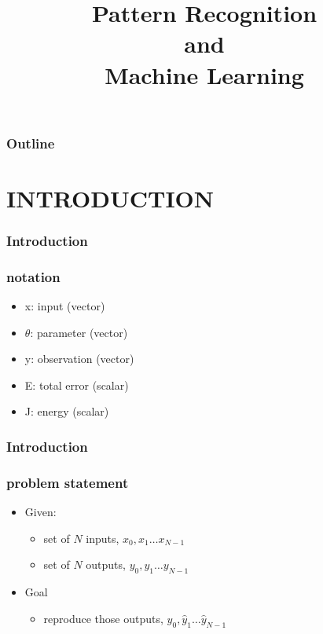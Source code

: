 
\title{Pattern Recognition \\ and \\ Machine Learning}
\begin{frame}\logoTree
	\institute{}
	\titlepage
\end{frame}

\begin{frame}\frametitle{Outline}\logoTree
	\setcounter{tocdepth}{1}	
	\tableofcontents
\end{frame}

\section{INTRODUCTION}
\begin{frame}
\frametitle{Introduction}
\frametitle{notation}
\logoCSIPCPL\mypagenum
	\begin{itemize}
		\item x: input (vector)
		\item $\theta$: parameter (vector)
		\item y: observation (vector)
		\item E: total error (scalar)
		\item J: energy (scalar)
	\end{itemize}
\end{frame}




\begin{frame}
\frametitle{Introduction}
\frametitle{problem statement}
\logoCSIPCPL\mypagenum
	\begin{itemize}
		\item Given:
			\begin{itemize}
				\item set of $N$ inputs, $x_0, x_1 \ldots x_{N-1}$
				\item set of $N$ outputs, $y_0, y_1 \ldots y_{N-1}$
			\end{itemize}
		\item Goal
			\begin{itemize}
				\item reproduce those outputs, $\hat{y}_0, \hat{y}_1 \ldots \hat{y}_{N-1}$
			\end{itemize}
	\end{itemize}
\end{frame}


